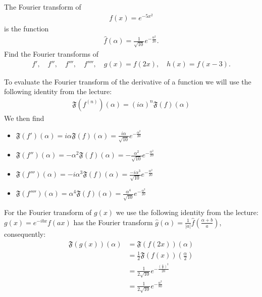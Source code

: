 \documentclass[11pt]{article}
\begin{document}
\begin{exercise}
    The Fourier transform of 
    \begin{align*}
        f(x) = e^{-5x^2}
    \end{align*}
    is the function 
    \begin{align*}
        \hat f(\alpha) = \frac{1}{\sqrt{10}} e^{-\frac{\alpha^2}{20}}.
    \end{align*}
    Find the Fourier transforms of 
    \begin{align*}
     f', \quad f'', \quad f''', \quad f'''', \quad g(x) = f(2x), \quad h(x) = f(x-3).
    \end{align*}
\end{exercise}
\begin{solution}  
    To evaluate the Fourier transform of the derivative of a function we will use the following identity from the lecture:
    \begin{gather*}
        \mathfrak{F}\left(f^{(n)}\right)(\alpha)=(i \alpha)^n \mathfrak{F}(f)(\alpha)
    \end{gather*}
    We then find 
    \begin{itemize}
    \item $\mathfrak{F}\left(f'    \right)(\alpha) = i \alpha \mathfrak{F}(f)(\alpha) = \frac{i \alpha}{\sqrt{10}} e^{-\frac{\alpha^2}{20}}$
    \item $\mathfrak{F}\left(f''   \right)(\alpha) = -\alpha^2 \mathfrak{F}(f)(\alpha) = -\frac{ \alpha^2}{\sqrt{10}} e^{-\frac{\alpha^2}{20}}$
    \item $\mathfrak{F}\left(f'''  \right)(\alpha) = -i \alpha^3 \mathfrak{F}(f)(\alpha) = \frac{-i \alpha^3}{\sqrt{10}} e^{-\frac{\alpha^2}{20}}$
    \item $\mathfrak{F}\left(f'''' \right)(\alpha) = \alpha^4 \mathfrak{F}(f)(\alpha) = \frac{ \alpha^4}{\sqrt{10}} e^{-\frac{\alpha^2}{20}}$
    \end{itemize}
    For the Fourier transform of $g(x)$ we use the following identity from the lecture: 
    $g(x)=e^{-i b x} f(a x)$ has the Fourier transform
    $\hat{g}(\alpha)=\frac{1}{|a|} \hat{f}\left(\frac{\alpha+b}{a}\right)$,
    consequently:
    \begin{align*}
        \mathfrak{F}(g(x))(\alpha) & =\mathfrak{F}(f(2 x))(\alpha) \\ & =\frac{1}{2} \mathfrak{F}(f(x))\left(\frac{\alpha}{2}\right) \\ & =\frac{1}{2 \sqrt{10}} e^{-\frac{\left(\frac{\alpha}{2}\right)^2}{20}} \\ & =\frac{1}{2 \sqrt{10}} e^{-\frac{\alpha^2}{80}}

\end{align*}
\end{solution}
\end{document}
